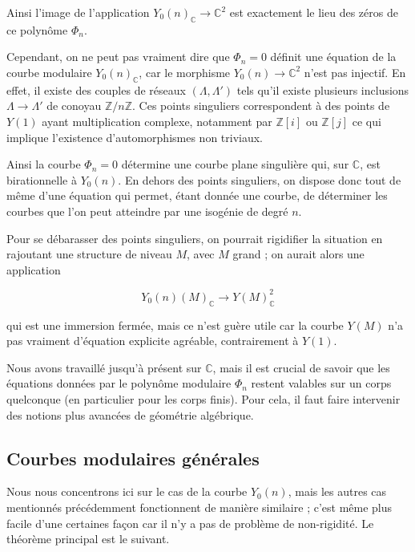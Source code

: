 \documentclass[11pt,a4paper]{article}
\newcommand{\Z}{\mathbb{Z}}
\newcommand{\C}{\mathbb{C}}
\newcommand{\vers}{\rightarrow}
\theoremstyle{definition}
\begin{document}
Ainsi l'image de l'application $Y_0(n)_\C\vers \C^2$ est exactement le lieu des zéros de ce polynôme $\Phi_n$.

Cependant, on ne peut pas vraiment dire que $\Phi_n=0$ définit une équation de la courbe modulaire $Y_0(n)_\C$, car le morphisme $Y_0(n)\vers \C^2$ n'est pas injectif. En effet, il existe des couples de réseaux $(\Lambda, \Lambda')$ tels qu'il existe plusieurs inclusions $\Lambda\vers\Lambda'$ de conoyau $\Z/n\Z$. Ces points singuliers correspondent à des points de $Y(1)$ ayant multiplication complexe, notamment par $\Z[i]$ ou $\Z[j]$ ce qui implique l'existence d'automorphismes non triviaux.

Ainsi la courbe $\Phi_n=0$ détermine une courbe plane singulière qui, sur $\C$, est birationnelle à $Y_0(n)$. En dehors des points singuliers, on dispose donc tout de même d'une équation qui permet, étant donnée une courbe, de déterminer les courbes que l'on peut atteindre par une isogénie de degré $n$.

Pour se débarasser des points singuliers, on pourrait rigidifier la situation en rajoutant une structure de niveau $M$, avec $M$ grand ; on aurait alors une application

$$Y_0(n)(M)_\C\vers Y(M)_\C^2$$

qui est une immersion fermée, mais ce n'est guère utile car la courbe $Y(M)$ n'a pas vraiment d'équation explicite agréable, contrairement à $Y(1)$.

Nous avons travaillé jusqu'à présent sur $\C$, mais il est crucial de savoir que les équations données par le polynôme modulaire $\Phi_n$ restent valables sur un corps quelconque (en particulier pour les corps finis). Pour cela, il faut faire intervenir des notions plus avancées de géométrie algébrique.

\newpage

\subsection{Courbes modulaires générales}


Nous nous concentrons ici sur le cas de la courbe $Y_0(n)$, mais les autres cas mentionnés précédemment fonctionnent de manière similaire ; c'est même plus facile d'une certaines façon car il n'y a pas de problème de non-rigidité. Le théorème principal est le suivant.
\end{document}
